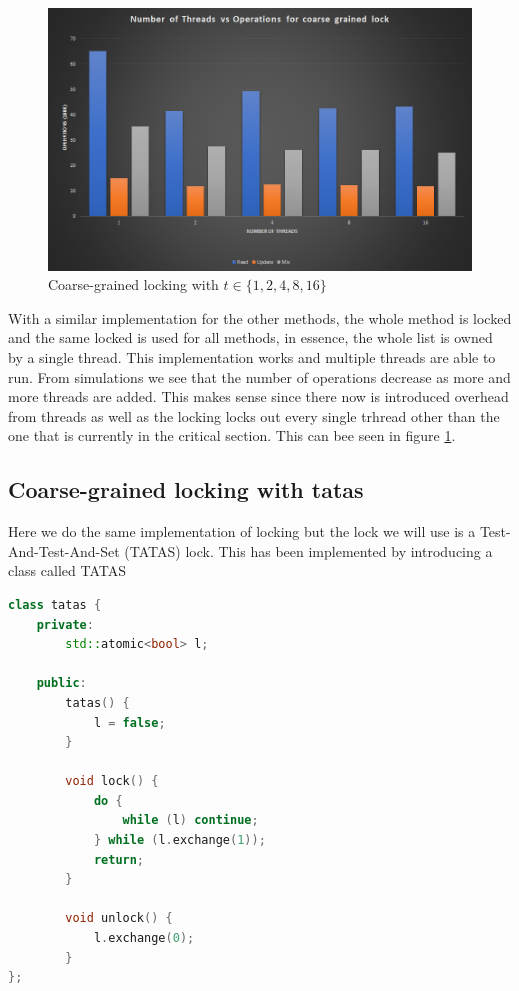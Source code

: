 \begin{figure}
    \centering
    \includegraphics[width=\linewidth]{Figures/coarsegrained.png}
    \caption{Coarse-grained locking with $t \in \{1, 2, 4, 8, 16\}$}
    \label{fig:coarsegrained}
\end{figure}

With a similar implementation for the other methods, the whole method is locked
and the same locked is used for all methods, in essence, the whole list is owned
by a single thread. This implementation works and multiple threads are able to 
run. From simulations we see that the number of operations decrease as more and
more threads are added. This makes sense since there now is introduced overhead
from threads as well as the locking locks out every single trhread other than 
the one that is currently in the critical section. This can bee seen in figure
\ref{fig:coarsegrained}.

\subsection{Coarse-grained locking with tatas}
Here we do the same implementation of locking but the lock we will use is a
Test-And-Test-And-Set (TATAS) lock. This has been implemented by introducing a 
class called TATAS

\begin{lstlisting}[language=C++, caption=TATAS Class]
class tatas {
	private:
		std::atomic<bool> l;

	public:
		tatas() {
			l = false;
		}

		void lock() {
			do {
				while (l) continue;
			} while (l.exchange(1));
			return;
		}

		void unlock() {
			l.exchange(0);
		}
};
\end{lstlisting}

